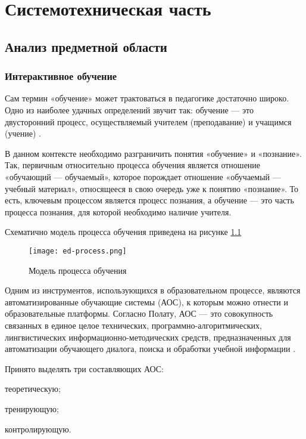 \chapter{Системотехническая часть}

\section{Анализ предметной области}
\subsection{Интерактивное обучение}
Сам термин «обучение» может трактоваться в педагогике достаточно широко. Одно из наиболее удачных определений звучит так:
обучение — это двусторонний процесс, осуществляемый учителем (преподавание) и учащимся (учение) \cite{pedDict}.

В данном контексте необходимо разграничить понятия «обучение» и «познание». Так, первичным относительно процесса обучения является отношение «обучающий — обучаемый», которое порождает отношение «обучаемый — учебный материал», относящееся в свою очередь уже к понятию «познание». То есть, ключевым процессом является процесс познания, а обучение — это часть процесса познания, для которой необходимо наличие учителя.

Схематично модель процесса обучения приведена на рисунке \ref{fig:ed-process}

\begin{figure}[htbp]
\centering
\texttt{[image: ed-process.png]}
\caption{Модель процесса обучения}%
\label{fig:ed-process}
\end{figure}

Одним из инструментов, использующихся в образовательном процессе, являются автоматизированные обучающие системы (АОС), к которым можно отнести и образовательные платформы. Согласно Полату, АОС — это совокупность связанных в единое целое технических, программно-алгоритмических, лингвистических информационно-методических средств, предназначенных для автоматизации обучающего диалога, поиска и обработки учебной информации \cite{Polat}.

Принято выделять три составляющих АОС:
\begin{itemize*}
\item теоретическую;
\item тренирующую;
\item контролирующую.
\end{itemize*}

